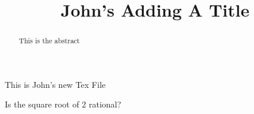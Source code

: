 \documentclass{ximera}
\title{John's Adding A Title}
\begin{document}
\begin{abstract}
This is the abstract
\end{abstract}
\maketitle
This is John's new Tex File

\begin{question}
Is the square root of 2 rational?
	\begin{multipleChoice}
	\end{multipleChoice}
\end{question}
\end{document}
